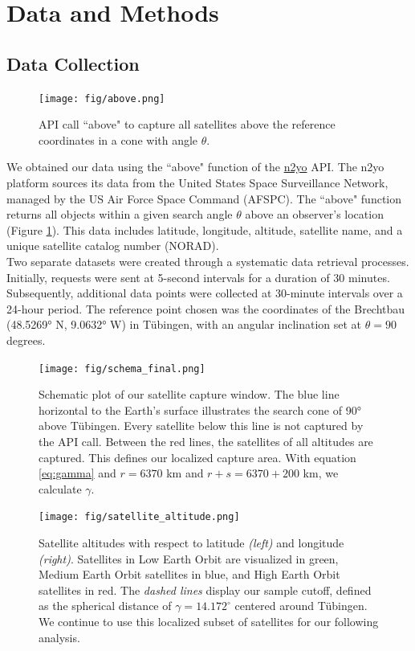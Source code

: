 \documentclass{article}
\theoremstyle{plain}
\theoremstyle{definition}
\theoremstyle{remark}
\begin{document}
\section{Data and Methods}\label{sec:methods}

\subsection{Data Collection}
\begin{figure}[h]
    \begin{center}
        \texttt{[image: fig/above.png]}
        \caption{API call ``above" to capture all satellites above the reference coordinates in a cone with angle $\theta$.}
        \label{fig:above}
    \end{center}
\end{figure}

We obtained our data using the ``above" function of the \href{https://www.n2yo.com/api/}{n2yo} API. The n2yo platform sources its data from the United States Space Surveillance Network, managed by the US Air Force Space Command (AFSPC). The ``above" function returns all objects within a given search angle $\theta$ above an observer's location (Figure \ref{fig:above}). This data includes latitude, longitude, altitude, satellite name, and a unique satellite catalog number (NORAD).\\
Two separate datasets were created through a systematic data retrieval processes. Initially, requests were sent at 5-second intervals for a duration of 30 minutes. Subsequently, additional data points were collected at 30-minute intervals over a 24-hour period. The reference point chosen was the coordinates of the Brechtbau (48.5269° N, 9.0632° W) in Tübingen, with an angular inclination set at $\theta=90$ degrees.
\begin{figure}
    \begin{center}
        \texttt{[image: fig/schema\_final.png]}
        \caption{Schematic plot of our satellite capture window. The blue line horizontal to the Earth's surface illustrates the search cone of 90° above Tübingen. Every satellite below this line is not captured by the API call. Between the red lines, the satellites of all altitudes are captured. This defines our localized capture area. With equation \ref{eq:gamma} and $r=6370$ km and $r+s=6370+200$ km, we calculate $\gamma$.}
        \label{fig:schematic_plot}
    \end{center}
\end{figure}
\begin{figure}[h!]
    \begin{center}
        \texttt{[image: fig/satellite\_altitude.png]}
        \caption{Satellite altitudes with respect to latitude \textit{(left)} and longitude \textit{(right)}. Satellites in Low Earth Orbit are visualized in green, Medium Earth Orbit satellites in blue, and High Earth Orbit satellites in red. The \textit{dashed lines} display our sample cutoff, defined as the spherical distance of $\gamma = 14.172^\circ$ centered around Tübingen. We continue to use this localized subset of satellites for our following analysis.}
        \label{fig:altitude}
    \end{center}
\end{figure}
\end{document}
